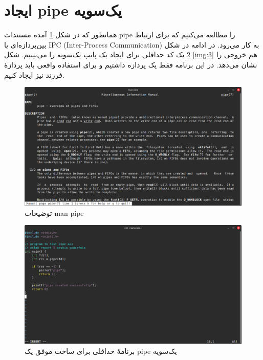 \documentclass[12pt]{article}
\begin{document}
	\section{ایجاد \textenglish{pipe} یک‌سویه}
	همانطور که در شکل \ref{img:1} آمده مستندات pipe را مطالعه می‌کنیم که برای ارتباط بین‌پردازه‌ای یا \textenglish{IPC (Inter-Process Communication)} به کار می‌رود. در ادامه در شکل \ref{img:2} یک کد حداقلی برای ایجاد یک پایپ یک‌سویه را می‌بینیم. شکل \ref{img:3} هم خروجی را نشان می‌دهد. در این برنامه فقط یک پردازه داشتیم و برای استفاده واقعی باید پردازهٔ فرزند نیز ایجاد کنیم.
	\begin{figure}[H]
		\centering
		\includegraphics[width=\textwidth]{report5-resources/1.png}
		\caption{توضیحات \textenglish{man pipe}}
		\label{img:1}
	\end{figure}
	\begin{figure}[H]
		\centering
		\includegraphics[width=\textwidth]{report5-resources/2.png}
		\caption{برنامهٔ حداقلی برای ساخت موفق یک \textenglish{pipe} یک‌سویه}
		\label{img:2}
	\end{figure}
\end{document}

